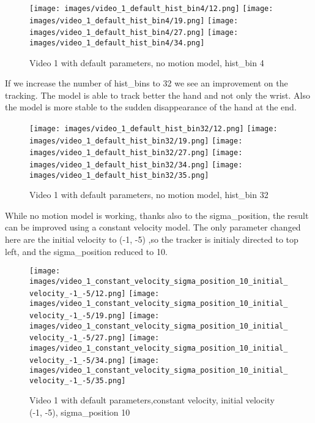 \documentclass{ETHExercise}
\begin{document}
\begin{figure}[!h]
    \texttt{[image: images/video\_1\_default\_hist\_bin4/12.png]}
  \endminipage
    \texttt{[image: images/video\_1\_default\_hist\_bin4/19.png]}
  \endminipage
    \texttt{[image: images/video\_1\_default\_hist\_bin4/27.png]}
  \endminipage\space
    \texttt{[image: images/video\_1\_default\_hist\_bin4/34.png]}
  \endminipage
  \caption{Video 1 with default parameters, no motion model, hist\_bin 4}
\end{figure}

\newpage
If we increase the number of hist\_bins to 32 we see
an improvement on the tracking. The model is able to track better 
the hand and not only the wrist. Also the model is 
more stable to the sudden disappearance of the hand at the end.
\begin{figure}[!h]
    \texttt{[image: images/video\_1\_default\_hist\_bin32/12.png]}
  \endminipage
    \texttt{[image: images/video\_1\_default\_hist\_bin32/19.png]}
  \endminipage
    \texttt{[image: images/video\_1\_default\_hist\_bin32/27.png]}
  \endminipage\space
    \texttt{[image: images/video\_1\_default\_hist\_bin32/34.png]}
  \endminipage
    \texttt{[image: images/video\_1\_default\_hist\_bin32/35.png]}
  \endminipage
  \caption{Video 1 with default parameters, no motion model, hist\_bin 32}
\end{figure}

\newpage
While no motion model is working, thanks also to the sigma\_position,
the result can be improved using a constant velocity model. 
The only parameter changed here are the initial velocity to (-1, -5) 
,so the tracker is initialy directed to top left, and the sigma\_position
reduced to 10.


\begin{figure}[!h]
    \texttt{[image: images/video\_1\_constant\_velocity\_sigma\_position\_10\_initial\_velocity\_-1\_-5/12.png]}
  \endminipage
    \texttt{[image: images/video\_1\_constant\_velocity\_sigma\_position\_10\_initial\_velocity\_-1\_-5/19.png]}
  \endminipage
    \texttt{[image: images/video\_1\_constant\_velocity\_sigma\_position\_10\_initial\_velocity\_-1\_-5/27.png]}
  \endminipage\space
    \texttt{[image: images/video\_1\_constant\_velocity\_sigma\_position\_10\_initial\_velocity\_-1\_-5/34.png]}
  \endminipage
    \texttt{[image: images/video\_1\_constant\_velocity\_sigma\_position\_10\_initial\_velocity\_-1\_-5/35.png]}
  \endminipage
  \caption{Video 1 with default parameters,constant velocity, initial velocity (-1, -5), sigma\_position 10}
\end{figure}
\end{document}
